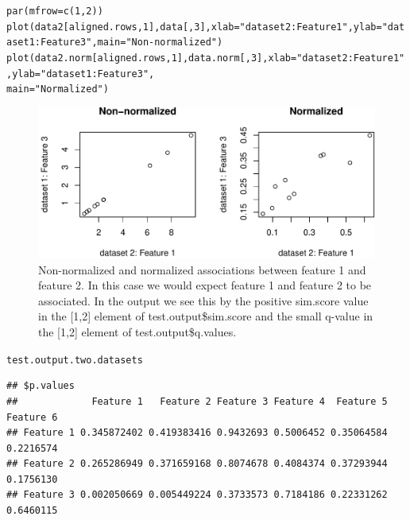 \documentclass{article}\usepackage[]{graphicx}\usepackage[usenames,dvipsnames]{color}
\makeatletter
\def\maxwidth{ %
  \ifdim\Gin@nat@width>\linewidth
    \linewidth
  \else
    \Gin@nat@width
  \fi
}
\newcommand{\hlnum}[1]{\textcolor[rgb]{0.816,0.125,0.439}{#1}}%
\newcommand{\hlstr}[1]{\textcolor[rgb]{0.251,0.627,0.251}{#1}}%
\newcommand{\hlstd}[1]{\textcolor[rgb]{0.251,0.251,0.251}{#1}}%
\newcommand{\hlkwc}[1]{\textcolor[rgb]{0.251,0.251,0.251}{#1}}%
\newcommand{\hlkwd}[1]{\textcolor[rgb]{0.878,0.439,0.125}{#1}}%
\newenvironment{knitrout}{}{} %
\makeatother
\begin{document}
\begin{knitrout}
\color{fgcolor}\begin{kframe}
\begin{alltt}
\hlkwd{par}\hlstd{(}\hlkwc{mfrow}\hlstd{=}\hlkwd{c}\hlstd{(}\hlnum{1}\hlstd{,}\hlnum{2}\hlstd{))}
\hlkwd{plot}\hlstd{(data2[aligned.rows,}\hlnum{1}\hlstd{],data[,}\hlnum{3}\hlstd{],}\hlkwc{xlab}\hlstd{=}\hlstr{"dataset 2: Feature 1"}\hlstd{,}\hlkwc{ylab}\hlstd{=}\hlstr{"dataset 1: Feature 3"}\hlstd{,}\hlkwc{main}\hlstd{=}\hlstr{"Non-normalized"}\hlstd{)}
\hlkwd{plot}\hlstd{(data2.norm[aligned.rows,}\hlnum{1}\hlstd{],data.norm[,}\hlnum{3}\hlstd{],}\hlkwc{xlab}\hlstd{=}\hlstr{"dataset 2: Feature 1"}\hlstd{,}\hlkwc{ylab}\hlstd{=}\hlstr{"dataset 1: Feature 3"}\hlstd{,}
     \hlkwc{main}\hlstd{=}\hlstr{"Normalized"}\hlstd{)}
\end{alltt}
\end{kframe}\begin{figure}[H]
\includegraphics[width=\maxwidth]{figure/unnamed-chunk-7-1} \caption{Non-normalized and normalized associations between feature 1 and feature 2.  In this case we would expect feature 1 and feature 2 to be associated. In the output we see this by the positive sim.score value in the [1,2] element of test.output\$sim.score and the small q-value in the [1,2] element of test.output\$q.values.}\label{fig:unnamed-chunk-7}
\end{figure}
\begin{kframe}\begin{alltt}
\hlstd{test.output.two.datasets}
\end{alltt}
\begin{verbatim}
## $p.values
##             Feature 1   Feature 2 Feature 3 Feature 4  Feature 5 Feature 6
## Feature 1 0.345872402 0.419383416 0.9432693 0.5006452 0.35064584 0.2216574
## Feature 2 0.265286949 0.371659168 0.8074678 0.4084374 0.37293944 0.1756130
## Feature 3 0.002050669 0.005449224 0.3733573 0.7184186 0.22331262 0.6460115

\end{verbatim}
\end{kframe}
\end{knitrout}
\end{document}
